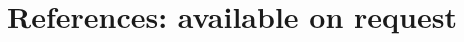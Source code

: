 \documentclass[11pt]{article}
\newcommand{\years}[1]{\marginnote{\footnotesize #1}}
\begin{document}


\section*{References: available on request}



\end{document}
